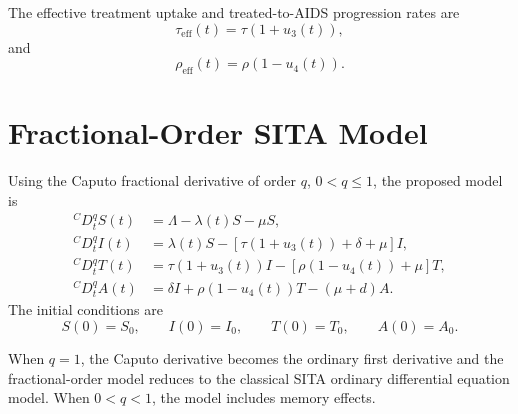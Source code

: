 \documentclass[12pt,a4paper,oneside]{report}
\newcommand{\CaputoD}[2]{{}^{C}D_{#1}^{#2}}
\newcommand{\taueff}{\tau_{\mathrm{eff}}}
\newcommand{\rhoeff}{\rho_{\mathrm{eff}}}
\begin{document}
The effective treatment uptake and treated-to-AIDS progression rates are
\begin{equation}
\taueff(t)=\tau(1+u_3(t)),
\end{equation}
and
\begin{equation}
\rhoeff(t)=\rho(1-u_4(t)).
\end{equation}

\section{Fractional-Order SITA Model}
Using the Caputo fractional derivative of order $q$, $0<q\leq1$, the proposed model is
\begin{align}
\CaputoD{t}{q}S(t) &= \Lambda-\lambda(t)S-\mu S, \label{eq:fractional_S}\\[4pt]
\CaputoD{t}{q}I(t) &= \lambda(t)S-[\tau(1+u_3(t))+\delta+\mu]I, \label{eq:fractional_I}\\[4pt]
\CaputoD{t}{q}T(t) &= \tau(1+u_3(t))I-[\rho(1-u_4(t))+\mu]T, \label{eq:fractional_T}\\[4pt]
\CaputoD{t}{q}A(t) &= \delta I+\rho(1-u_4(t))T-(\mu+d)A. \label{eq:fractional_A}
\end{align}
The initial conditions are
\begin{equation}
S(0)=S_0,\qquad I(0)=I_0,\qquad T(0)=T_0,\qquad A(0)=A_0.
\end{equation}

\begin{remarkbox}[title={Connection with the Ordinary Model}]
When $q=1$, the Caputo derivative becomes the ordinary first derivative and the fractional-order model reduces to the classical SITA ordinary differential equation model. When $0<q<1$, the model includes memory effects.
\end{remarkbox}

\newpage
 
\end{document}
